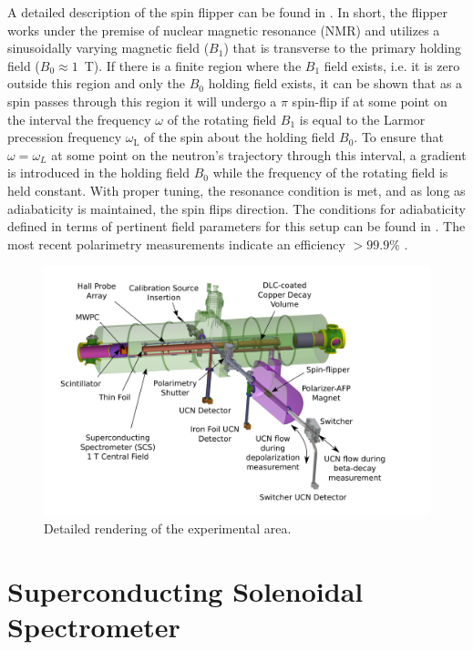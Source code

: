 A detailed description of the spin flipper can be found in \cite{holley2012high}. In short, the
flipper works under the premise of nuclear magnetic resonance (NMR) and utilizes a sinusoidally
varying magnetic field ($B_1$) that is transverse to the primary holding field ($B_0\approx 1$~T).
If there is a finite region where the $B_1$ field exists, i.e. it is zero outside this region and only
the $B_0$ holding field exists, it can be shown that as a spin passes through this region
it will undergo a $\pi$ spin-flip if at some point on the interval
the frequency $\omega$ of the rotating field $B_1$ is equal to the
Larmor precession frequency $\omega_{\mathrm{L}}$ of the spin about the holding field $B_0$.
To ensure that $\omega = \omega_L$ at some point
on the neutron's trajectory through this interval,
a gradient is introduced in the holding field $B_0$ while the frequency of
the rotating field is held constant. With proper tuning, the resonance condition is met, and as long
as adiabaticity is maintained, the spin flips direction. The conditions for adiabaticity defined in terms
of pertinent field parameters for this setup can be found in
\cite{holley2012high}. The most recent polarimetry measurements indicate an efficiency $>99.9\%$ \cite{brown2017}.

\begin{figure}[h]
  \centering
  \includegraphics[scale=0.38]{2-UCNAExperiment/UCNAFig.pdf} 
  \caption{Detailed rendering of the experimental area. }
  \label{fig:setup}
\end{figure}

\section{Superconducting Solenoidal Spectrometer}

